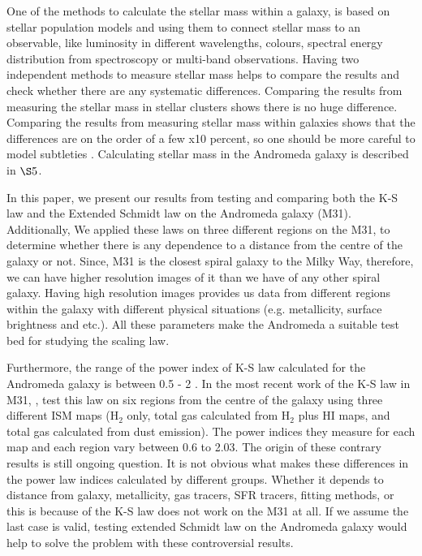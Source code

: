 \documentclass[useAMS,usenatbib]{mn2e}
\begin{document}
One of the methods to calculate the stellar mass within a galaxy, is based on stellar population models \citep[e.g.][]{ Bruzual93, Kotulla09} and using them to connect stellar mass to an observable, like luminosity in different wavelengths, colours, spectral energy distribution from spectroscopy or multi-band observations. Having two independent methods to measure stellar mass helps to compare the results and check whether there are any systematic differences. Comparing the results from measuring the stellar mass in stellar clusters shows there is no huge difference. Comparing the results from measuring stellar mass within galaxies shows that the differences are on the order of a few x10 percent, so one should be more careful to model subtleties \citep{McLaughlin05}. Calculating stellar mass in the Andromeda galaxy is described in $\S5$.

In this paper, we present our results from testing and comparing both the K-S law and the Extended Schmidt law on the Andromeda galaxy (M31). %
Additionally, We applied these laws on three different regions on the M31, to determine whether there is any dependence to a distance from the centre of the galaxy or not. Since, M31 is the closest spiral galaxy to the Milky Way, therefore, we can have higher resolution images of it than we have of any other spiral galaxy. Having high resolution images provides us data from different regions within the galaxy with different physical situations (e.g. metallicity, surface brightness and etc.). All these parameters make the Andromeda a suitable test bed for studying the scaling law.

Furthermore, the range of the power index of K-S law calculated for the Andromeda galaxy is between 0.5 - 2 \citep[e.g.,][]{Tabatabaei10,Ford13}. %
In the most recent work of the K-S law in M31, \cite{Ford13}, test this law on six regions from the centre of the galaxy using three different ISM maps (H$_2$ only, total gas calculated from H$_2$ plus HI maps, and total gas calculated from dust emission). The power indices they measure for each map and each region vary between 0.6 to 2.03. The origin of these contrary results is still ongoing question. It is not obvious what makes these differences in the power law indices calculated by different groups. Whether it depends to distance from galaxy, metallicity, gas tracers, SFR tracers, fitting methods, or this is because of the K-S law does not work on the M31 at all. If we assume the last case is valid, testing extended Schmidt law on the Andromeda galaxy would help to solve the problem with these controversial results.
\end{document}
